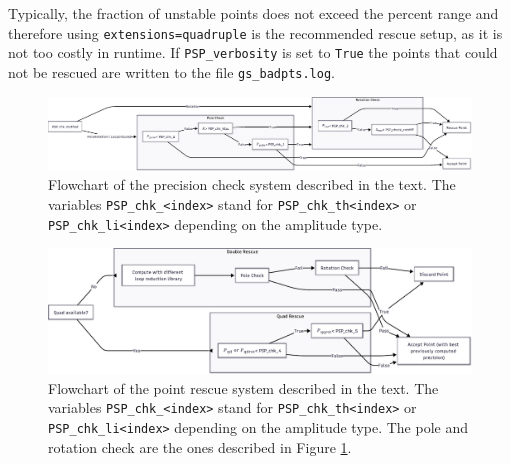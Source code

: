 Typically, the fraction of unstable points does not exceed the percent range and therefore using \texttt{extensions=quadruple} is the recommended rescue setup, as it is not too costly in runtime. If \texttt{PSP\_verbosity} is set to \texttt{True} the points that could not be rescued are written to the file \texttt{gs\_badpts.log}.

\begin{landscape}
\begin{figure}
    \centering
    \includegraphics[scale=1.1]{figures/PSP_Check.pdf}
    \caption{Flowchart of the precision check system described in the text. The variables \texttt{PSP\_chk\_<index>} stand for \texttt{PSP\_chk\_th<index>} or \texttt{PSP\_chk\_li<index>} depending on the amplitude type.}
    \label{fig:rescue-check}
\end{figure}
\end{landscape}

\begin{landscape}
\begin{figure}
    \centering
    \includegraphics[scale=1]{figures/PSP_Rescue.pdf}
    \caption{Flowchart of the point rescue system described in the text. The variables \texttt{PSP\_chk\_<index>} stand for \texttt{PSP\_chk\_th<index>} or \texttt{PSP\_chk\_li<index>} depending on the amplitude type. The pole and rotation check are the ones described in Figure \ref{fig:rescue-check}.}
    \label{fig:rescue-rescue}
\end{figure}
\end{landscape}
